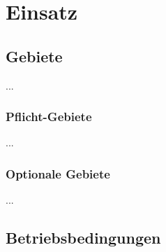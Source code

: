 %
%


\chapter{Einsatz}
\label{Einsatz}


\section{Gebiete}

...
\\


\subsection*{Pflicht-Gebiete}

...
\\


\subsection*{Optionale Gebiete}

...
\\


\section{Betriebsbedingungen}
